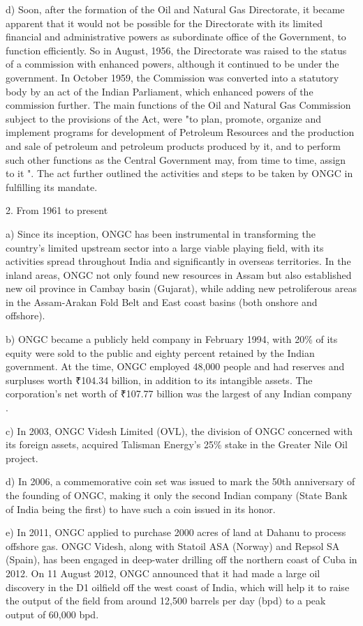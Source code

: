 d) Soon, after the formation of the Oil and Natural Gas Directorate, it became apparent that it would not be possible for the Directorate with its limited financial and administrative powers as subordinate office of the Government, to function efficiently. So in August, 1956, the Directorate was raised to the status of a commission with enhanced powers, although it continued to be under the government. In October 1959, the Commission was converted into a statutory body by an act of the Indian Parliament, which enhanced powers of the commission further. The main functions of the Oil and Natural Gas Commission subject to the provisions of the Act, were "to plan, promote, organize and implement programs for development of Petroleum Resources and the production and sale of petroleum and petroleum products produced by it, and to perform such other functions as the Central Government may, from time to time, assign to it ". The act further outlined the activities and steps to be taken by ONGC in fulfilling its mandate.

2. From 1961 to present

a) Since its inception, ONGC has been instrumental in transforming the country's limited upstream sector into a large viable playing field, with its activities spread throughout India and significantly in overseas territories. In the inland areas, ONGC not only found new resources in Assam but also established new oil province in Cambay basin (Gujarat), while adding new petroliferous areas in the Assam-Arakan Fold Belt and East coast basins (both onshore and offshore).

b) ONGC became a publicly held company in February 1994, with 20\% of its equity were sold to the public and eighty percent retained by the Indian government. At the time, ONGC employed 48,000 people and had reserves and surpluses worth ₹104.34 billion, in addition to its intangible assets. The corporation's net worth of ₹107.77 billion was the largest of any Indian company .

c) In 2003, ONGC Videsh Limited (OVL), the division of ONGC concerned with its foreign assets, acquired Talisman Energy's 25\% stake in the Greater Nile Oil project.

d) In 2006, a commemorative coin set was issued to mark the 50th anniversary of the founding of ONGC, making it only the second Indian company (State Bank of India being the first) to have such a coin issued in its honor.

e) In 2011, ONGC applied to purchase 2000 acres of land at Dahanu to process offshore gas. ONGC Videsh, along with Statoil ASA (Norway) and Repsol SA (Spain), has been engaged in deep-water drilling off the northern coast of Cuba in 2012. On 11 August 2012, ONGC announced that it had made a large oil discovery in the D1 oilfield off the west coast of India, which will help it to raise the output of the field from around 12,500 barrels per day (bpd) to a peak output of 60,000 bpd.

